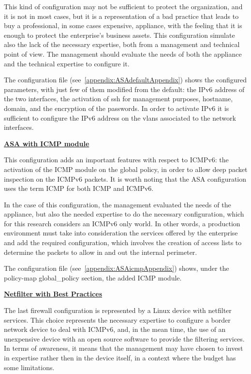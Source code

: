 \documentclass[12pt]{article}
\begin{document}
This kind of configuration may not be sufficient to protect the organization, and it is not in most cases, but it is a representation of a bad practice that leads to buy a professional, in some cases expensive, appliance, with the feeling that it is enough to protect the enterprise's business assets. This configuration simulate also the lack of the necessary expertise, both from a management and technical point of view. The management should evaluate the needs of both the appliance and the technical expertise to configure it.

The configuration file (see~\ref{appendix:ASAdefaultAppendix}) shows the configured parameters, with just few of them modified from the default: the IPv6 address of the two interfaces, the activation of ssh for management purposes, hostname, domain, and the encryption of the passwords. In order to activate IPv6 it is sufficient to configure the IPv6 address on the vlans associated to the network interfaces.

\textbf{\underline{ASA with ICMP module}}
\label{subsub:asaDefaultICMP}

This configuration adds an important features with respect to ICMPv6: the activation of the ICMP module on the global policy, in order to allow deep packet inspection on the ICMPv6 packets. It is worth noting that the ASA configuration uses the term ICMP for both ICMP and ICMPv6.

In the case of this configuration, the management evaluated the needs of the appliance, but also the needed expertise to do the necessary configuration, which for this research considers an ICMPv6 only world. In other words, a production environment must take into consideration the services offered by the enterprise and add the required configuration, which involves the creation of access lists to determine the packets to allow in and out the internal perimeter.

The configuration file (see~\ref{appendix:ASAicmpAppendix}) shows, under the policy-map global_policy section, the added ICMP module.

\textbf{\underline{Netfilter with Best Practices}}
\label{subsub:netfilterBestPractices}

The last firewall configuration is represented by a Linux device with netfilter services. This choice represents the necessary expertise to configure a border network device to deal with ICMPv6, and, in the mean time, the use of an unexpensive device with an open source software to provide the filtering services. In terms of awareness, it means that the management may have chosen to invest in expertise rather then in the device itself, in a context where the budget has some limitations.
\end{document}
